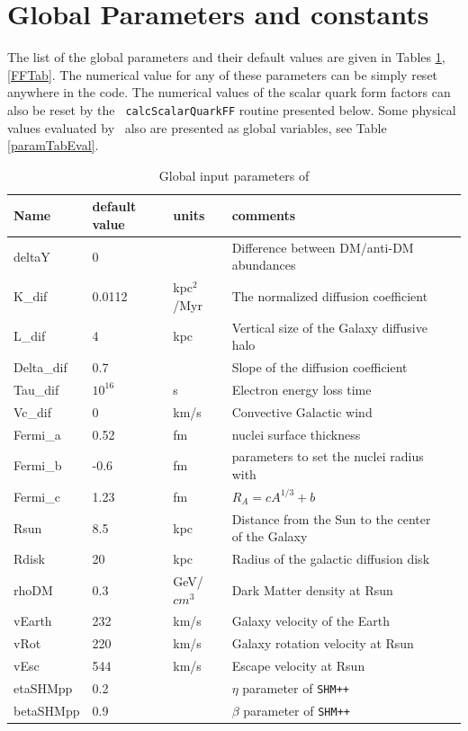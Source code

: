 \documentclass[12pt,a4paper]{article}
\begin{document}
\section{Global Parameters and constants}
\label{sec:global_parameters}

 The list of the
global parameters  and their default values  are given  in Tables
\ref{paramTab}, \ref{FFTab}. 
The numerical value for any of these parameters can be simply reset anywhere in the code. 
The numerical values of  the scalar quark form factors can also be reset by the {\tt
calcScalarQuarkFF} routine presented below. Some physical values  evaluated by \micro\  also are presented as global variables,  see Table \ref{paramTabEval}. 

\begin{table}[htbp]
 \caption{Global input parameters of \micro}
 \label{paramTab}
\begin{center}
\begin{tabular}{|l|l|l|l|l|}
\hline
  Name      &default value & units &  comments \\  \hline
  deltaY     &  0          &           & Difference between DM/anti-DM abundances\\
K\_dif      & 0.0112     & kpc$^2$/Myr & The normalized diffusion coefficient\\
L\_dif      & 4           & kpc       & Vertical size of the Galaxy diffusive halo \\
Delta\_dif   & 0.7        &           &Slope of the diffusion coefficient\\ 
Tau\_dif    & $10^{16}$   &   s       &Electron energy loss time\\
Vc\_dif     & 0           &  km/s     &  Convective Galactic wind \\
Fermi\_a    &  0.52        &  fm   & nuclei  surface thickness \\
Fermi\_b    &  -0.6        &  fm   &  parameters to set the nuclei radius with  \\    
Fermi\_c    &  1.23        &  fm   &  $R_A=c A^{1/3} +b$ \\ 
Rsun        & 8.5          & kpc   & Distance from the Sun to the center of the Galaxy\\
Rdisk       & 20           & kpc   & Radius of the galactic diffusion disk \\
rhoDM       &  0.3         & GeV/$cm^3$ & Dark Matter density at Rsun\\
vEarth      &  232       & km/s     & Galaxy velocity of the Earth     \\
vRot       &  220   & km/s     & Galaxy rotation velocity at Rsun     \\
vEsc       &  544   & km/s     & Escape velocity at Rsun     \\
etaSHMpp   &  0.2   &          & $\eta$ parameter of {\tt SHM++}\\
betaSHMpp  &  0.9   &          & $\beta$ parameter of {\tt SHM++}\\
\hline
\end{tabular}
\end{center}
\end{table}
\end{document}
